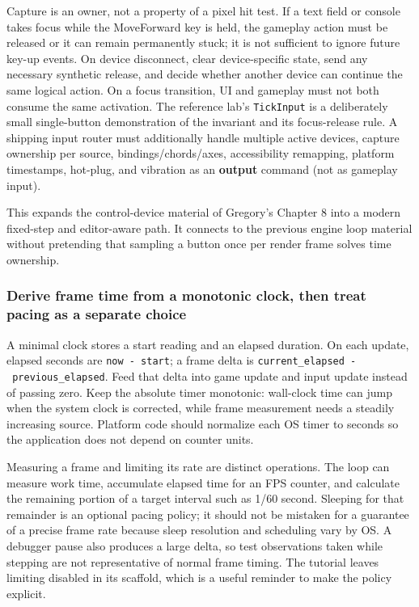 Capture is an owner, not a property of a pixel hit test. If a text field or console takes focus while the MoveForward key is held, the gameplay action must be released or it can remain permanently stuck; it is not sufficient to ignore future key-up events. On device disconnect, clear device-specific state, send any necessary synthetic release, and decide whether another device can continue the same logical action. On a focus transition, UI and gameplay must not both consume the same activation. The reference lab's \texttt{TickInput} is a deliberately small single-button demonstration of the invariant and its focus-release rule. A shipping input router must additionally handle multiple active devices, capture ownership per source, bindings/chords/axes, accessibility remapping, platform timestamps, hot-plug, and vibration as an \textbf{output} command (not as gameplay input).

This expands the control-device material of Gregory's Chapter 8 into a modern fixed-step and editor-aware path. It connects to the previous engine loop material without pretending that sampling a button once per render frame solves time ownership.

\subsubsection{Derive frame time from a monotonic clock, then treat pacing as a separate choice}\label{05-engine-i-ch014-derive-frame-time-from-a-monotonic-clock-then-treat-pacing-as-a-separate-choice}

A minimal clock stores a start reading and an elapsed duration. On each update, elapsed seconds are \texttt{now\ -\ start}; a frame delta is \texttt{current\_elapsed\ -\ previous\_elapsed}. Feed that delta into game update and input update instead of passing zero. Keep the absolute timer monotonic: wall-clock time can jump when the system clock is corrected, while frame measurement needs a steadily increasing source. Platform code should normalize each OS timer to seconds so the application does not depend on counter units.

Measuring a frame and limiting its rate are distinct operations. The loop can measure work time, accumulate elapsed time for an FPS counter, and calculate the remaining portion of a target interval such as 1/60 second. Sleeping for that remainder is an optional pacing policy; it should not be mistaken for a guarantee of a precise frame rate because sleep resolution and scheduling vary by OS. A debugger pause also produces a large delta, so test observations taken while stepping are not representative of normal frame timing. The tutorial leaves limiting disabled in its scaffold, which is a useful reminder to make the policy explicit.

